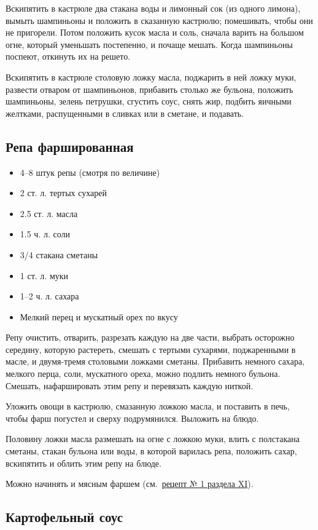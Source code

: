 Вскипятить в кастрюле два стакана воды и лимонный сок (из одного лимона), вымыть шампиньоны и положить в сказанную кастрюлю; помешивать, чтобы они не пригорели. Потом положить кусок масла и соль, сначала варить на большом огне, который уменьшать постепенно, и почаще мешать. Когда шампиньоны поспеют, откинуть их на решето.

Вскипятить в кастрюле столовую ложку масла, поджарить в ней ложку муки, развести отваром от шампиньонов, прибавить столько же бульона, положить шампиньоны, зелень петрушки, сгустить соус, снять жир, подбить яичными желтками, распущенными в сливках или в сметане, и подавать.

\subsection{Репа фаршированная}

\begin{itemize}
	\item 4–8 штук репы (смотря по величине)
	\item 2 ст. л. тертых сухарей 
    \item 2.5 ст. л. масла 
    \item 1.5 ч. л. соли 
    \item 3/4 стакана сметаны 
    \item 1 ст. л. муки 
    \item 1–2 ч. л. сахара 
    \item Мелкий перец и мускатный орех по вкусу
\end{itemize}

Репу очистить, отварить, разрезать каждую на две части, выбрать осторожно середину, которую растереть, смешать с тертыми сухарями, поджаренными в масле, и двумя-тремя столовыми ложками сметаны. Прибавить немного сахара, мелкого перца, соли, мускатного ореха, можно подлить немного бульона. Смешать, нафаршировать этим репу и перевязать каждую ниткой.

Уложить овощи в кастрюлю, смазанную ложкою масла, и поставить в печь, чтобы фарш погустел и сверху подрумянился. Выложить на блюдо.

Половину ложки масла размешать на огне с ложкою муки, влить с полстакана сметаны, стакан бульона или воды, в которой варилась репа, положить сахар, вскипятить и облить этим репу на блюде.

Можно начинять и мясным фаршем (см.~\hyperref[1farsh-gov]{рецепт № 1 раздела XI}).

\subsection{Картофельный соус}


